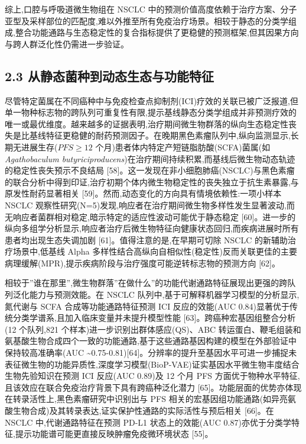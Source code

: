 \documentclass[11pt]{article}
\begin{document}
综上,口腔与呼吸道微生物组在 NSCLC 中的预测价值高度依赖于治疗方案、分子亚型及采样部位的匹配度,难以外推至所有免疫治疗场景。相较于静态的分类学组成,整合功能通路与生态稳定性的复合指标提供了更稳健的预测框架,但其因果方向与跨人群泛化性仍需进一步验证。

\subsection{2.3 从静态菌种到动态生态与功能特征}\label{ux4eceux9759ux6001ux83ccux79cdux5230ux52a8ux6001ux751fux6001ux4e0eux529fux80fdux7279ux5f81}

尽管特定菌属在不同癌种中与免疫检查点抑制剂(ICI)疗效的关联已被广泛报道,但单一物种标志物的跨队列可重复性有限,提示基线静态分类学组成并非预测疗效的唯一或最优维度。越来越多的证据表明,治疗期间微生物群落的纵向生态稳定性丧失是比基线特征更稳健的耐药预测因子。在晚期黑色素瘤队列中,纵向监测显示,长期无进展生存(\(PFS \geq 12\) 个月)患者体内特定产短链脂肪酸(SCFA)菌属(如 \emph{Agathobaculum butyriciproducens})在治疗期间持续积累,而基线后微生物动态轨迹的稳定性丧失预示不良结局 {[}58{]}。这一发现在非小细胞肺癌(NSCLC)与黑色素瘤的联合分析中得到印证,治疗初期个体内微生物稳定性的丧失独立于抗生素暴露,与原发性耐药显著相关 {[}59{]}。然而,动态变化的方向具有情境依赖性:一项小样本 NSCLC 观察性研究(N=5)发现,响应者在治疗期间微生物多样性发生显著波动,而无响应者菌群相对稳定,暗示特定的适应性波动可能优于静态稳定 {[}60{]}。进一步的纵向多组学分析显示,响应者治疗后微生物特征向健康状态回归,而疾病进展时所有患者均出现生态失调加剧 {[}61{]}。值得注意的是,在早期可切除 NSCLC 的新辅助治疗场景中,低基线 Alpha 多样性结合高纵向自相似性(稳定性)反而关联更佳的主要病理缓解(MPR),提示疾病阶段与治疗强度可能逆转标志物的预测方向 {[}62{]}。

相较于''谁在那里'',微生物群落''在做什么''的功能代谢通路特征展现出更强的跨队列泛化能力与预测效能。在 NSCLC 队列中,基于可解释机器学习模型的分析显示,氮代谢与 SCFA 合成等功能通路特征预测 ICI 反应的效能(AUC 0.84)显著优于传统分类学谱系,且加入临床变量并未提升模型性能 {[}63{]}。跨癌种宏基因组整合分析(12 个队列,821 个样本)进一步识别出群体感应(QS)、ABC 转运蛋白、鞭毛组装和氨基酸生物合成四个一致的功能通路,基于这些通路基因构建的模型在外部验证中保持较高准确率(AUC \textasciitilde0.75-0.81){[}64{]}。分辨率的提升至基因水平可进一步捕捉未表征微生物的功能异质性,深度学习模型(BioP-VAE)证实基因水平微生物丰度结合生物先验知识在预测 ICI 反应(AUC 0.89)及 12 个月 PFS 方面优于物种水平特征,且该效应在联合免疫治疗背景下具有跨癌种泛化潜力 {[}65{]}。功能层面的优势亦体现在转录活性上,黑色素瘤研究中识别出与 PFS 相关的宏基因组功能通路(如异亮氨酸生物合成)及其转录表达,证实保护性通路的实际活性与预后相关 {[}66{]}。在 NSCLC 中,代谢通路特征在预测 PD-L1 状态上的效能(AUC 0.87)亦优于分类学特征,提示功能谱可能更直接反映肿瘤免疫微环境状态 {[}55{]}。
\end{document}
